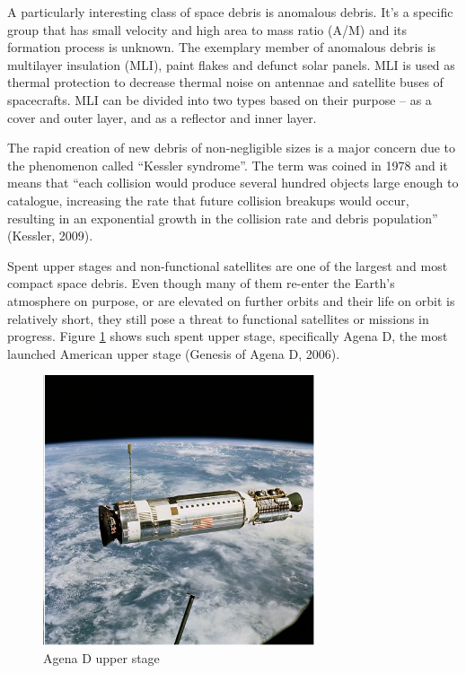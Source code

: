 	A particularly interesting class of space debris is anomalous debris. It’s a specific group that has small velocity and high area to mass ratio (A/M) and its formation process is unknown. The exemplary member of anomalous debris is multilayer insulation (MLI),  paint flakes and defunct solar panels. MLI is used as thermal protection to decrease thermal noise on antennae and satellite buses of spacecrafts. MLI can be divided into two types based on their purpose – as a cover and outer layer, and as a reflector and inner layer.
	
	The rapid creation of new debris of non-negligible sizes is a major concern due to the phenomenon called “Kessler syndrome”. The term was coined in 1978 and it means that “each collision would produce several hundred objects large enough to catalogue, increasing the rate that future collision breakups would occur, resulting in an exponential growth in the collision rate and debris population” (Kessler, 2009). 
	
	Spent upper stages and non-functional satellites are one of the largest and most compact space debris. Even though many of them re-enter the Earth's atmosphere on purpose, or are elevated on further orbits and their life on orbit is relatively short, they still pose a threat to functional satellites or missions in progress. Figure \ref{fig:upperstage} shows such spent upper stage, specifically Agena D, the most launched American upper stage (Genesis of Agena D, 2006).
	
\begin{figure}[H]
\centering
  \includegraphics[width=8cm]{images/upperstage}
  \caption{Agena D upper stage}
  \label{fig:upperstage}
\end{figure}
	
\pagebreak


